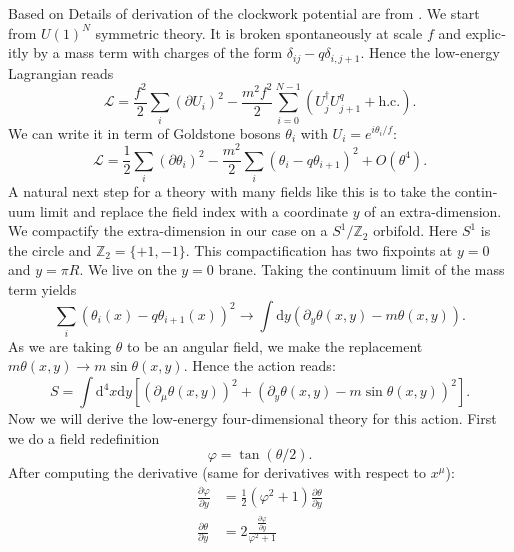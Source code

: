\documentclass[master,       %
               twoside,        %
               BCOR10mm,       %
               english,ngerman, %
               ]{GAUBM}
\begin{document}
\begin{otherlanguage}{english}
Based on \cite{Deformed_potential_Bae_2019}
Details of derivation of the clockwork potential are from \cite{general_cont_clockwork_Choi_2018}.
We start from  $U(1)^N$ symmetric theory. It is broken spontaneously at scale $f$ and explicitly by a mass term with charges of the form $\delta_{ij} - q \delta_{i,j+1}$. Hence the low-energy Lagrangian reads
\begin{equation}
	\mathcal{L} = \frac{f^2}{2} \sum_i (\partial U_i)^2 - \frac{m^2 f^2}{2} \sum_{i = 0}^{N - 1} (U_j^\dagger U^q_{j + 1} + \mathrm{h.c.}).
\end{equation}
We can write it in term of Goldstone bosons $\theta_i$ with $U_i = e^{i \theta_i/ f}$:
\begin{equation}
	\mathcal{L} = \frac{1}{2} \sum_i (\partial \theta_i)^2 - \frac{m^2}{2} \sum_i (\theta_i - q \theta_{i + 1})^2 + O(\theta^4).
\end{equation}
A natural next step for a theory with many fields like this is to take the continuum limit and replace the field index with a coordinate $y$ of an extra-dimension.
We compactify the extra-dimension in our case on a $S^1 / \mathbb{Z}_2$ orbifold. Here $S^1$ is the circle and $\mathbb{Z}_2 = \{+1, -1\}$. This compactification has two fixpoints at $y = 0$ and $y = \pi R$. We live on the $y = 0$ brane.
Taking the continuum limit of the mass term yields
\begin{equation}
	\sum_i (\theta_i(x) - q \theta_{i + 1}(x))^2 \to \int \mathrm{d} y (\partial_y \theta(x, y) - m \theta(x, y) ).
\end{equation}
As we are taking $\theta$ to be an angular field, we make the replacement $m \theta(x, y) \to m \sin \theta(x, y)$.
Hence the action reads:
\begin{equation}
	S = \int \mathrm{d}^4 x \mathrm{d} y \left[ (\partial_\mu \theta(x, y))^2 + (\partial_y \theta(x, y) - m \sin \theta(x, y))^2 \right].
\end{equation}
Now we will derive the low-energy four-dimensional theory for this action.
First we do a field redefinition
\begin{equation}
	\varphi = \tan ( \theta / 2 ).
\end{equation}
After computing the derivative (same for derivatives with respect to $x^\mu$):
\begin{align}
	\frac{\partial \varphi}{\partial y} &= \frac{1}{2} (\varphi^2 + 1) \frac{\partial \theta}{\partial y} \nonumber \\
	\frac{\partial \theta}{\partial y} &= 2 \frac{\frac{\partial \varphi}{\partial y}}{\varphi^2 + 1} 

\end{align}
\end{otherlanguage}
\end{document}
